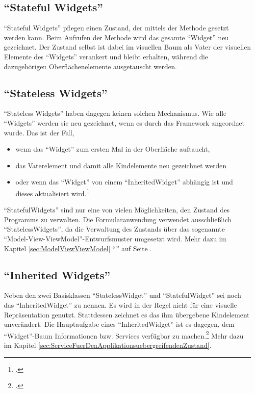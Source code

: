 \subsection{\enquote{Stateful Widgets}}

\enquote{Stateful Widgets} pflegen einen Zustand, der mittels der Methode  gesetzt werden kann.
Beim Aufrufen der Methode wird das gesamte \enquote{Widget} neu gezeichnet.
Der Zustand selbst ist dabei im visuellen Baum als Vater der visuellen Elemente des \enquote{Widgets} verankert und bleibt erhalten, während die dazugehörigen Oberflächenelemente ausgetauscht werden.

\subsection{\enquote{Stateless Widgets}}


\enquote{Stateless Widgets} haben dagegen keinen solchen Mechanismus.
Wie alle \enquote{Widgets} werden sie neu gezeichnet, wenn es durch das Framework angeordnet wurde.
Das ist der Fall,
\begin{itemize}[topsep=0pt,itemsep=-1ex,partopsep=1ex,parsep=1ex]
  \item wenn das \enquote{Widget} zum ersten Mal in der Oberfläche auftaucht,
  \item das Vaterelement und damit alle Kindelemente neu gezeichnet werden
  \item oder wenn das \enquote{Widget} von einem \enquote{InheritedWidget} abhängig ist und dieses aktualisiert wird.\footcite[Vgl.][]{StatelessWidget}
\end{itemize}


\enquote{StatefulWidgets} sind nur eine von vielen Möglichkeiten, den Zustand des Programms zu verwalten.
Die Formularanwendung verwendet ausschließlich \enquote{StatelessWidgets}, da die Verwaltung des Zustands über das sogenannte \enquote{Model-View-ViewModel}-Entwurfsmuster umgesetzt wird.
Mehr dazu im Kapitel \ref{sec:ModelViewViewModel} \enquote{} auf Seite \pageref{sec:ModelViewViewModel}.

\subsection{\enquote{Inherited Widgets}}

Neben den zwei Basisklassen \enquote{StatelessWidget} und \enquote{StatefulWidget} sei noch das \enquote{InheritedWidget} zu nennen.
Es wird in der Regel nicht für eine visuelle Repräsentation genutzt. Stattdessen zeichnet es das ihm übergebene Kindelement unverändert.
Die Hauptaufgabe eines \enquote{InheritedWidget} ist es dagegen, dem \enquote{Widget}-Baum Informationen bzw. Services verfügbar zu machen.\footcite[Vgl.][]{InheritedWidget}
Mehr dazu im Kapitel \ref{sec:ServiceFuerDenApplikationsuebergreifendenZustand}. 



